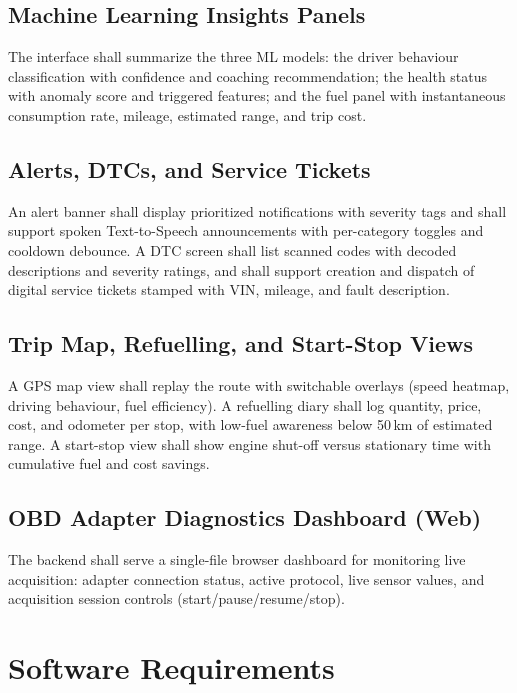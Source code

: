 \documentclass[10pt,a4paper]{report}
\begin{document}
\subsection{Machine Learning Insights Panels}
The interface shall summarize the three ML models: the driver behaviour classification with confidence and coaching recommendation; the health status with anomaly score and triggered features; and the fuel panel with instantaneous consumption rate, mileage, estimated range, and trip cost. \par

\subsection{Alerts, DTCs, and Service Tickets}
An alert banner shall display prioritized notifications with severity tags and shall support spoken Text-to-Speech announcements with per-category toggles and cooldown debounce. A DTC screen shall list scanned codes with decoded descriptions and severity ratings, and shall support creation and dispatch of digital service tickets stamped with VIN, mileage, and fault description. \par

\subsection{Trip Map, Refuelling, and Start-Stop Views}
A GPS map view shall replay the route with switchable overlays (speed heatmap, driving behaviour, fuel efficiency). A refuelling diary shall log quantity, price, cost, and odometer per stop, with low-fuel awareness below 50\,km of estimated range. A start-stop view shall show engine shut-off versus stationary time with cumulative fuel and cost savings. \par

\subsection{OBD Adapter Diagnostics Dashboard (Web)}
The backend shall serve a single-file browser dashboard for monitoring live acquisition: adapter connection status, active protocol, live sensor values, and acquisition session controls (start/pause/resume/stop). \par

\section{Software Requirements }
\end{document}
